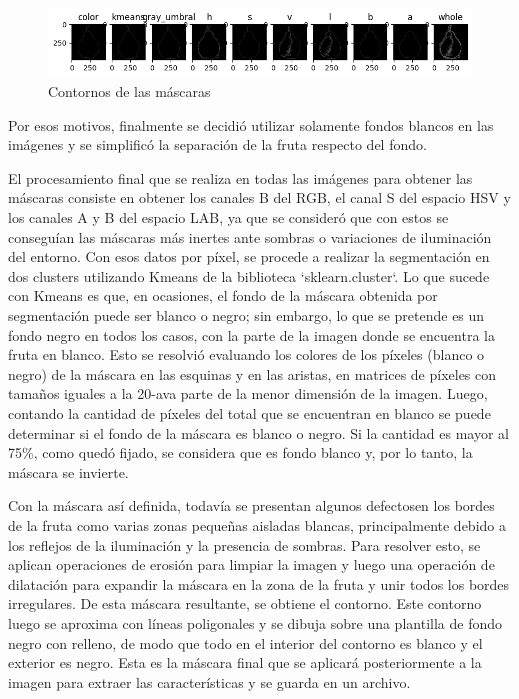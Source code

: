\documentclass[a4paper, 12pt]{article}
\begin{document}
\begin{figure}[!htbp]
    \centering
    \includegraphics[width=\linewidth]{CONTORNOS.png}
    \caption{Contornos de las máscaras}
    \label{CONTORNOS}
\end{figure}

Por esos motivos, finalmente se decidió utilizar solamente fondos blancos en las imágenes y se simplificó la separación de la fruta respecto del fondo.

El procesamiento final que se realiza en todas las imágenes para obtener las máscaras consiste en obtener los canales B del RGB, el canal S del espacio HSV y los canales A y B del espacio LAB, ya que se consideró que con estos se conseguían las máscaras más inertes ante sombras o variaciones de iluminación del entorno. Con esos datos por píxel, se procede a realizar la segmentación en dos clusters utilizando Kmeans de la biblioteca `sklearn.cluster`. Lo que sucede con Kmeans es que, en ocasiones, el fondo de la máscara obtenida por segmentación puede ser blanco o negro; sin embargo, lo que se pretende es un fondo negro en todos los casos, con la parte de la imagen donde se encuentra la fruta en blanco. Esto se resolvió evaluando los colores de los píxeles (blanco o negro) de la máscara en las esquinas y en las aristas, en matrices de píxeles con tamaños iguales a la 20-ava parte de la menor dimensión de la imagen. Luego, contando la cantidad de píxeles del total que se encuentran en blanco se puede determinar si el fondo de la máscara es blanco o negro. Si la cantidad es mayor al 75\%, como quedó fijado, se considera que es fondo blanco y, por lo tanto, la máscara se invierte.

Con la máscara así definida, todavía se presentan algunos defectosen los bordes de la fruta como varias zonas pequeñas aisladas blancas, principalmente debido a los reflejos de la iluminación y la presencia de sombras. Para resolver esto, se aplican operaciones de erosión para limpiar la imagen y luego una operación de dilatación para expandir la máscara en la zona de la fruta y unir todos los bordes irregulares. De esta máscara resultante, se obtiene el contorno. Este contorno luego se aproxima con líneas poligonales y se dibuja sobre una plantilla de fondo negro con relleno, de modo que todo en el interior del contorno es blanco y el exterior es negro. Esta es la máscara final que se aplicará posteriormente a la imagen para extraer las características y se guarda en un archivo.
\end{document}
